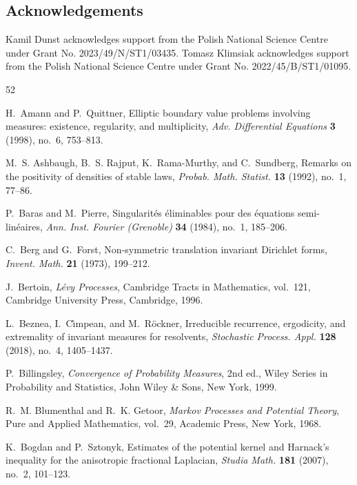 \documentclass[11pt,a4paper,reqno]{amsart}
\theoremstyle{definition}
\numberwithin{equation}{section}
\begin{document}
\subsection*{Acknowledgements}
{\small Kamil Dunst acknowledges support from the Polish National Science Centre under Grant No. 2023/49/N/ST1/03435. 
Tomasz Klimsiak acknowledges support from the Polish National Science Centre under Grant No. 2022/45/B/ST1/01095.}


\begin{thebibliography}{52}

H.~Amann and P.~Quittner,
Elliptic boundary value problems involving measures: existence, regularity, and multiplicity,
\emph{Adv. Differential Equations} \textbf{3} (1998), no.~6, 753--813.

M.~S. Ashbaugh, B.~S. Rajput, K.~Rama-Murthy, and C.~Sundberg,
Remarks on the positivity of densities of stable laws,
\emph{Probab. Math. Statist.} \textbf{13} (1992), no.~1, 77--86.

P.~Baras and M.~Pierre,
Singularit\'es \'eliminables pour des \'equations semi-lin\'eaires,
\emph{Ann. Inst. Fourier (Grenoble)} \textbf{34} (1984), no.~1, 185--206.



C.~Berg and G.~Forst,
Non-symmetric translation invariant Dirichlet forms,
\emph{Invent. Math.} \textbf{21} (1973), 199--212.

J.~Bertoin,
\emph{L\'evy Processes},
Cambridge Tracts in Mathematics, vol.~121,
Cambridge University Press, Cambridge, 1996.

L.~Beznea, I.~C\^{\i}mpean, and M.~R\"ockner,
Irreducible recurrence, ergodicity, and extremality of invariant measures for resolvents,
\emph{Stochastic Process. Appl.} \textbf{128} (2018), no.~4, 1405--1437.

P.~Billingsley,
\emph{Convergence of Probability Measures},
2nd ed., Wiley Series in Probability and Statistics,
John Wiley \& Sons, New York, 1999.

R.~M. Blumenthal and R.~K. Getoor,
\emph{Markov Processes and Potential Theory},
Pure and Applied Mathematics, vol.~29,
Academic Press, New York, 1968.

K.~Bogdan and P.~Sztonyk,
Estimates of the potential kernel and Harnack's inequality for the anisotropic fractional Laplacian,
\emph{Studia Math.} \textbf{181} (2007), no.~2, 101--123.


\end{thebibliography}
\end{document}
